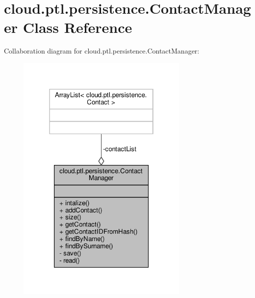 \hypertarget{classcloud_1_1ptl_1_1persistence_1_1ContactManager}{}\section{cloud.\+ptl.\+persistence.\+Contact\+Manager Class Reference}
\label{classcloud_1_1ptl_1_1persistence_1_1ContactManager}


Collaboration diagram for cloud.\+ptl.\+persistence.\+Contact\+Manager\+:
\nopagebreak
\begin{figure}[H]
\begin{center}
\leavevmode
\includegraphics[width=238pt]{classcloud_1_1ptl_1_1persistence_1_1ContactManager__coll__graph}
\end{center}
\end{figure}
